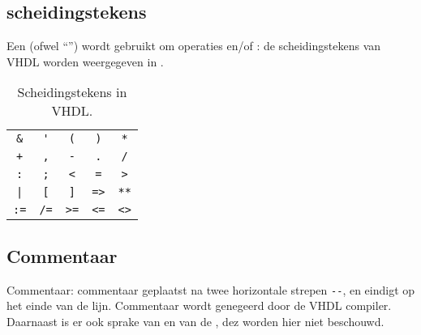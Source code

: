 \subsection{scheidingstekens}
Een  (ofwel ``'') wordt gebruikt om operaties en/of : de
scheidingstekens van VHDL worden weergegeven in .
\begin{table}[hbt]
\centering
\begin{tabular}{ccccc}
\verb+&+&\verb+'+&\verb+(+&\verb+)+&\verb+*+\\
\verb/+/&\verb+,+&\verb+-+&\verb+.+&\verb+/+\\
\verb+:+&\verb+;+&\verb+<+&\verb+=+&\verb+>+\\
\verb+|+&\verb+[+&\verb+]+&\verb+=>+&\verb+**+\\
\verb+:=+&\verb+/=+&\verb+>=+&\verb+<=+&\verb+<>+
\end{tabular}
\caption{Scheidingstekens in VHDL.}
\label{tbl:vHDLdelimiters}
\end{table}
\subsection{Commentaar}
Commentaar: commentaar geplaatst na twee horizontale strepen \verb+--+, en eindigt op het einde van de lijn. Commentaar wordt genegeerd door de VHDL compiler.
Daarnaast is er ook sprake van  en van de , dez worden hier niet beschouwd.
